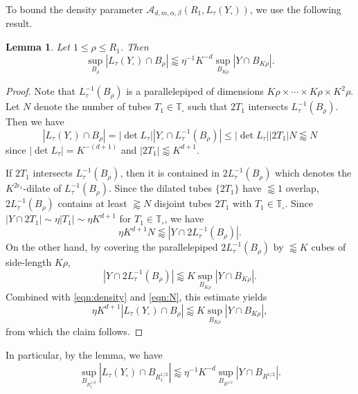 \documentclass[11pt]{amsart}
\newtheorem{lemma}[theorem]{Lemma}
\theoremstyle{definition}
\theoremstyle{remark}
\numberwithin{equation}{section}
\newcommand{\T}{\mathbb{T}}
\newcommand{\sq}{\square}
\newcommand{\less}{\lessapprox}
\newcommand{\eps}{\epsilon}
\begin{document}
To bound the density parameter $\mathcal{A}_{d,m,\alpha,\beta}(R_1,L_\tau(Y_\sq))$, we use the following result.
\begin{lemma}
Let $1\leq \rho \leq R_1$. Then 
\[ 	\sup_{B_\rho} |L_\tau(Y_\sq) \cap B_\rho| \less \eta^{-1}K^{-d} \sup_{B_{K\rho}} |Y\cap B_{K\rho}|. \]
\end{lemma}
\begin{proof}
Note that $L_\tau^{-1}(B_\rho)$ is a parallelepiped  of dimensions $K\rho\times \cdots \times K\rho \times K^2 \rho$. Let $N$ denote the number of tubes $T_1\in \T_\sq$ such that $2T_1$ intersects $L_\tau^{-1}(B_\rho)$. Then we have
\begin{equation}\label{eqn:density}
	|L_\tau(Y_\sq) \cap B_\rho| =  |\det L_\tau| |Y_\sq \cap L_\tau^{-1}(B_\rho)| \leq  |\det L_\tau| |2T_1| N \less N
\end{equation}
since $|\det L_\tau| = K^{-(d+1)}$ and $|2T_1| \less K^{d+1}$.

If $2T_1$ intersects $L_\tau^{-1}(B_\rho)$, then it is contained in $2L_\tau^{-1}(B_\rho)$ which denotes the $K^{2\eps_1}$-dilate of $L_\tau^{-1}(B_\rho)$. Since the dilated tubes $\{2T_1\}$ have $\less 1$ overlap, $2 L_\tau^{-1}(B_\rho)$ contains at least $\gtrapprox N$ disjoint tubes $2T_1$ with $T_1\in \T_\sq$. Since $|Y\cap 2T_1| \sim \eta |T_1| \sim \eta K^{d+1}$ for $T_1\in \T_\sq$, we have 
\begin{equation}\label{eqn:N}
	\eta K^{d+1} N \less | Y\cap  2 L_\tau^{-1}(B_\rho) |. 
\end{equation}
On the other hand, by covering the parallelepiped $2 L_\tau^{-1}(B_\rho)$ by $\less K$ cubes of side-length $K\rho$, 
\[ | Y\cap  2 L_\tau^{-1}(B_\rho) |  \less  K \sup_{B_{K\rho}} |Y\cap B_{K\rho}|.\]
Combined with \eqref{eqn:density}  and \eqref{eqn:N}, this estimate yields
\[ \eta K^{d+1}	|L_\tau(Y_\sq) \cap B_\rho| \less  K \sup_{B_{K\rho}} |Y\cap B_{K\rho}|, \]
from which the claim follows.
\end{proof}

In particular, by the lemma, we have 
\[ 	\sup_{B_{R_1^{1/2}}} |L_\tau(Y_\sq) \cap B_{R_1^{1/2}}| \less 	\eta^{-1}  K^{-d} \sup_{B_{R^{1/2}}} |Y\cap B_{R^{1/2}}|.\]
\end{document}
